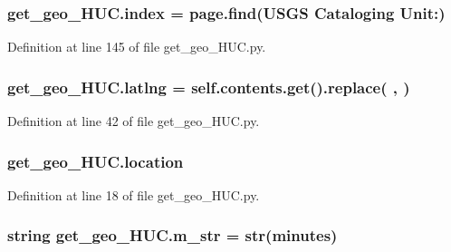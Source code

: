 \subsubsection[{\texorpdfstring{index}{index}}]{\setlength{\rightskip}{0pt plus 5cm}get\+\_\+geo\+\_\+\+H\+U\+C.\+index = page.\+find(\textquotesingle{}U\+S\+GS Cataloging Unit\+:\textquotesingle{})}\hypertarget{namespaceget__geo___h_u_c_a7d1d839fc837e44e52f5fba440d56faa}{}\label{namespaceget__geo___h_u_c_a7d1d839fc837e44e52f5fba440d56faa}


Definition at line 145 of file get\+\_\+geo\+\_\+\+H\+U\+C.\+py.

\subsubsection[{\texorpdfstring{latlng}{latlng}}]{\setlength{\rightskip}{0pt plus 5cm}get\+\_\+geo\+\_\+\+H\+U\+C.\+latlng = self.\+contents.\+get().replace(\textquotesingle{} \textquotesingle{}, \textquotesingle{}\textquotesingle{})}\hypertarget{namespaceget__geo___h_u_c_acafcc8295c3d6a0de2fb561809cca132}{}\label{namespaceget__geo___h_u_c_acafcc8295c3d6a0de2fb561809cca132}


Definition at line 42 of file get\+\_\+geo\+\_\+\+H\+U\+C.\+py.

\subsubsection[{\texorpdfstring{location}{location}}]{\setlength{\rightskip}{0pt plus 5cm}get\+\_\+geo\+\_\+\+H\+U\+C.\+location}\hypertarget{namespaceget__geo___h_u_c_a7592d1dc926835f8c651c5761a3cf94a}{}\label{namespaceget__geo___h_u_c_a7592d1dc926835f8c651c5761a3cf94a}


Definition at line 18 of file get\+\_\+geo\+\_\+\+H\+U\+C.\+py.

\subsubsection[{\texorpdfstring{m\+\_\+str}{m_str}}]{\setlength{\rightskip}{0pt plus 5cm}string get\+\_\+geo\+\_\+\+H\+U\+C.\+m\+\_\+str = str({\bf minutes})}\hypertarget{namespaceget__geo___h_u_c_a8aacd0fb25a1b4019c52fe5375534130}{}\label{namespaceget__geo___h_u_c_a8aacd0fb25a1b4019c52fe5375534130}


